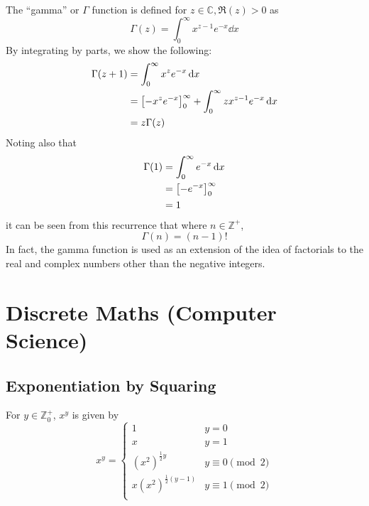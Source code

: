 \documentclass[fleqn,a4paper,11pt]{article}
\begin{document}
    The ``gamma'' or \(\Gamma\) function is defined for
    \(z \in \mathbb C, \Re(z) > 0\) as
    \begin{equation}
    \Gamma(z) = \int_0^{\infty} x^{z - 1}e^{-x} \dd{x}
    \end{equation}
    By integrating by parts, we show the following:
    \begin{align*}
    \Gamma(z + 1) &= \int_0^\infty x^{z}e^{-x} \dd{x} \\
                  &= \bqty{-x^{z} e^{-x}}_0^\infty
                     + \int_0^\infty zx^{z - 1}e^{-x} \dd{x} \\
                  &= z\Gamma(z)
    \end{align*}
    Noting also that
    \begin{align*}
    \Gamma(1) &= \int_0^\infty e^{-x} \dd{x} \\
              &= \bqty{-e^{-x}}_0^\infty \\
              &= 1
    \end{align*}
    it can be seen from this recurrence that where \(n \in \mathbb Z^+\),
    \begin{equation}
    \Gamma(n) = (n - 1)!
    \end{equation}
    In fact, the gamma function is used as an extension of the idea of
    factorials to the real and complex numbers other than the negative integers.

    \section{Discrete Maths (Computer Science)}

    \subsection{Exponentiation by Squaring} \label{sec_exp_by_squaring}


    For \(y \in \mathbb Z_0^+\), \(x^y\) is given by
    \begin{equation}
    x^y =
        \begin{cases}
        1 & y = 0 \\
        x & y = 1 \\
        (x ^ 2)^{\frac 12 y} & y \equiv 0 \pmod 2\\
        x(x ^ 2)^{\frac 12 (y-1)} & y \equiv 1 \pmod 2\\
        \end{cases}
    \end{equation}
\end{document}
